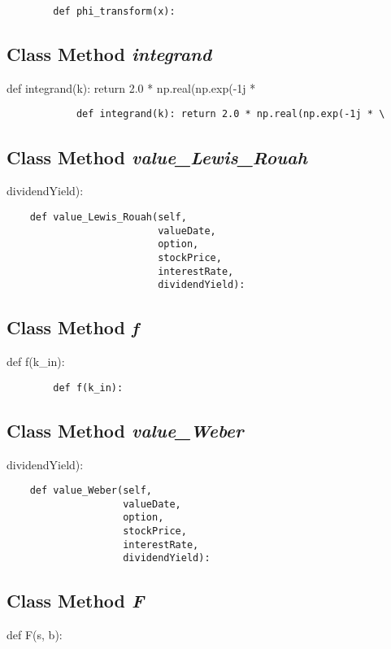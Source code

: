 \documentclass[twoside,11pt]{book}
\begin{document}
\begin{lstlisting}
        def phi_transform(x):
\end{lstlisting}

\subsection{Class Method {\it integrand}}
def integrand(k): return 2.0 * np.real(np.exp(-1j * \

\begin{lstlisting}
            def integrand(k): return 2.0 * np.real(np.exp(-1j * \
\end{lstlisting}

\subsection{Class Method {\it value\_Lewis\_Rouah}}
dividendYield):

\begin{lstlisting}
    def value_Lewis_Rouah(self,
                          valueDate,
                          option,
                          stockPrice,
                          interestRate,
                          dividendYield):
\end{lstlisting}

\subsection{Class Method {\it f}}
def f(k\_in):

\begin{lstlisting}
        def f(k_in):
\end{lstlisting}

\subsection{Class Method {\it value\_Weber}}
dividendYield):

\begin{lstlisting}
    def value_Weber(self,
                    valueDate,
                    option,
                    stockPrice,
                    interestRate,
                    dividendYield):
\end{lstlisting}

\subsection{Class Method {\it F}}
def F(s, b):
\end{document}
